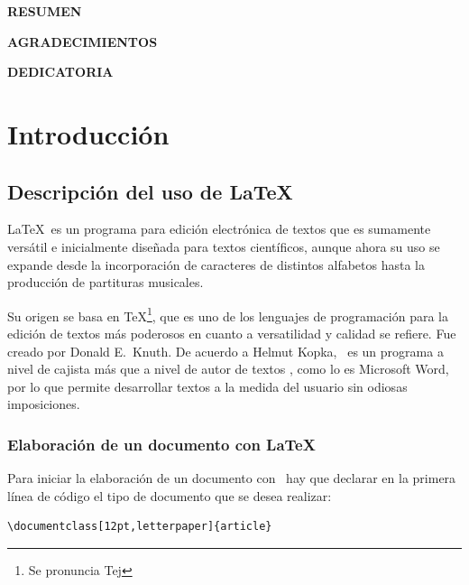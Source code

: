 \documentclass[12pt]{report}
\begin{document}
\vfill
\newpage
\begin{center}
{\Large \bf{RESUMEN}}
\end{center}
\newpage
\begin{center}
{\Large  \bf{AGRADECIMIENTOS}}
\end{center}
\newpage
\begin{center}
{\Large  \bf{DEDICATORIA}}
\end{center}
\newpage
\tableofcontents
\newpage
\listoftables
{} %
\listoffigures
{}

\chapter{Introducción}
\setcounter{page}{1}  %
\thispagestyle{empty}  %


\section{Descripción del uso de La\TeX}

La\TeX\ es un programa para edición electrónica de textos que es sumamente versátil e inicialmente diseñada para textos científicos, aunque ahora su uso se expande desde la incorporación de caracteres de distintos alfabetos hasta la producción de partituras musicales. 

Su origen se basa en \TeX \footnote{Se pronuncia Tej}, que es uno de los lenguajes de programación para la edición de textos más poderosos en cuanto a versatilidad y calidad se refiere. Fue creado por Donald E.~Knuth. De acuerdo a Helmut Kopka, \LaTeXe\ es un programa a nivel de cajista más que a nivel de autor de textos \cite{Kopka}, como lo es Microsoft Word, por lo que permite desarrollar textos a la medida del usuario sin odiosas imposiciones.

\subsection{Elaboración de un documento con \LaTeX}

Para iniciar la elaboración de un documento con \LaTeXe\ hay que declarar en la primera línea de código el tipo de documento que se desea realizar:

\begin{verbatim}
\documentclass[12pt,letterpaper]{article}
\end{verbatim}
%
\end{document}
